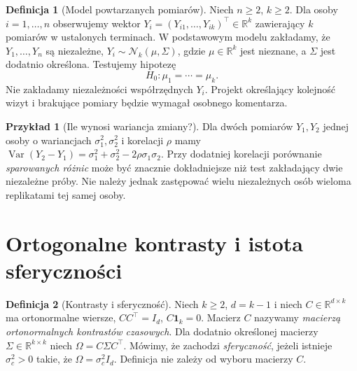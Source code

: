 \documentclass[11pt,a4paper,oneside]{report}
\numberwithin{equation}{chapter}
\theoremstyle{plain}
\theoremstyle{definition}
\newtheorem{definicja}{Definicja}[chapter]
\newtheorem{przyklad}{Przykład}[chapter]
\theoremstyle{remark}
\newcommand{\R}{\mathbb R}
\newcommand{\Var}{\operatorname{Var}}
\newcommand{\Normal}{\mathcal N}
\begin{document}
\begin{definicja}[Model powtarzanych pomiarów]\label{def:rm-model}
Niech $n\ge2$, $k\ge2$. Dla osoby $i=1,\ldots,n$ obserwujemy wektor $Y_i=(Y_{i1},\ldots,Y_{ik})^\top\in\R^k$ zawierający $k$ pomiarów w ustalonych terminach. W podstawowym modelu zakładamy, że $Y_1,\ldots,Y_n$ są niezależne, $Y_i\sim\Normal_k(\mu,\Sigma)$, gdzie $\mu\in\R^k$ jest nieznane, a $\Sigma$ jest dodatnio określona. Testujemy hipotezę
\[
 H_0:\mu_1=\cdots=\mu_k.
\]
Nie zakładamy niezależności współrzędnych $Y_i$. Projekt określający kolejność wizyt i brakujące pomiary będzie wymagał osobnego komentarza.
\end{definicja}

\begin{przyklad}[Ile wynosi wariancja zmiany?]
Dla dwóch pomiarów $Y_1,Y_2$ jednej osoby o wariancjach $\sigma_1^2,\sigma_2^2$ i korelacji $\rho$ mamy $\Var(Y_2-Y_1)=\sigma_1^2+\sigma_2^2-2\rho\sigma_1\sigma_2$. Przy dodatniej korelacji porównanie \emph{sparowanych różnic} może być znacznie dokładniejsze niż test zakładający dwie niezależne próby. Nie należy jednak zastępować wielu niezależnych osób wieloma replikatami tej samej osoby.
\end{przyklad}

\section{Ortogonalne kontrasty i istota sferyczności}
\begin{definicja}[Kontrasty i sferyczność]\label{def:sphericity}
Niech $k\ge2$, $d=k-1$ i niech $C\in\R^{d\times k}$ ma ortonormalne wiersze, $CC^\top=I_d$, $C\mathbf1_k=0$. Macierz $C$ nazywamy \emph{macierzą ortonormalnych kontrastów czasowych}. Dla dodatnio określonej macierzy $\Sigma\in\R^{k\times k}$ niech $\Omega=C\Sigma C^\top$. Mówimy, że zachodzi \emph{sferyczność}, jeżeli istnieje $\sigma_c^2>0$ takie, że $\Omega=\sigma_c^2 I_d$. Definicja nie zależy od wyboru macierzy $C$.
\end{definicja}
\end{document}
